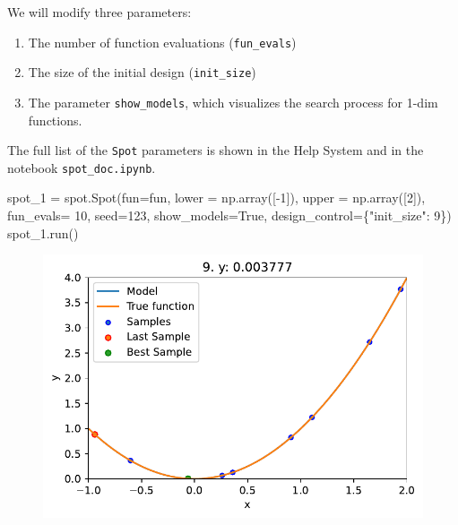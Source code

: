 \documentclass[
  letterpaper,
  DIV=11,
  numbers=noendperiod]{scrreprt}
\newenvironment{Shaded}{\begin{snugshade}}{\end{snugshade}}
\newcommand{\DecValTok}[1]{\textcolor[rgb]{0.68,0.00,0.00}{#1}}
\newcommand{\NormalTok}[1]{\textcolor[rgb]{0.00,0.23,0.31}{#1}}
\newcommand{\OperatorTok}[1]{\textcolor[rgb]{0.37,0.37,0.37}{#1}}
\newcommand{\StringTok}[1]{\textcolor[rgb]{0.13,0.47,0.30}{#1}}
\newcommand{\VariableTok}[1]{\textcolor[rgb]{0.07,0.07,0.07}{#1}}
\providecommand{\tightlist}{%
  \setlength{\itemsep}{0pt}\setlength{\parskip}{0pt}}\usepackage{longtable,booktabs,array}
\begin{document}
We will modify three parameters:

\begin{enumerate}
\def\labelenumi{\arabic{enumi}.}
\tightlist
\item
  The number of function evaluations (\texttt{fun\_evals})
\item
  The size of the initial design (\texttt{init\_size})
\item
  The parameter \texttt{show\_models}, which visualizes the search
  process for 1-dim functions.
\end{enumerate}

The full list of the \texttt{Spot} parameters is shown in the Help
System and in the notebook \texttt{spot\_doc.ipynb}.

\begin{Shaded}
\begin{Highlighting}[]
\NormalTok{spot\_1 }\OperatorTok{=}\NormalTok{ spot.Spot(fun}\OperatorTok{=}\NormalTok{fun,}
\NormalTok{                   lower }\OperatorTok{=}\NormalTok{ np.array([}\OperatorTok{{-}}\DecValTok{1}\NormalTok{]),}
\NormalTok{                   upper }\OperatorTok{=}\NormalTok{ np.array([}\DecValTok{2}\NormalTok{]),}
\NormalTok{                   fun\_evals}\OperatorTok{=} \DecValTok{10}\NormalTok{,}
\NormalTok{                   seed}\OperatorTok{=}\DecValTok{123}\NormalTok{,}
\NormalTok{                   show\_models}\OperatorTok{=}\VariableTok{True}\NormalTok{,}
\NormalTok{                   design\_control}\OperatorTok{=}\NormalTok{\{}\StringTok{"init\_size"}\NormalTok{: }\DecValTok{9}\NormalTok{\})}
\NormalTok{spot\_1.run()}
\end{Highlighting}
\end{Shaded}

\begin{figure}[H]

{\centering \includegraphics{01_spot_intro_files/figure-pdf/cell-10-output-1.pdf}

}

\end{figure}
\end{document}
